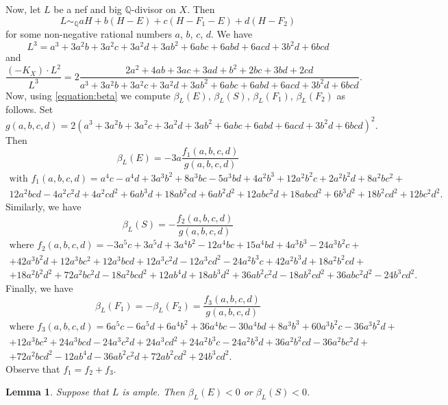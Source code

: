 \documentclass[12pt]{amsart}
\newtheorem{lemma}[theorem]{Lemma}
\theoremstyle{definition}
\theoremstyle{remark}
\begin{document}
Now, let $L$ be a nef and big $\mathbb{Q}$-divisor on $X$. Then
$$
L\sim_{\mathbb{Q}} aH+b(H-E)+c(H-F_1-E)+d(H-F_2)
$$
for some non-negative rational numbers $a$, $b$, $c$, $d$. We have
$$
L^3=a^3+3a^2b+3a^2c+3a^2d+3ab^2+6abc+6abd+6acd+3b^2d+6bcd
$$
and
$$
\frac{(-K_X)\cdot L^{2}}{L^3}=2\frac{2a^2+4ab+3ac+3ad+b^2+2bc+3bd+2cd}{a^3+3a^2b+3a^2c+3a^2d+3ab^2+6abc+6abd+6acd+3b^2d+6bcd}.
$$
Now, using \eqref{equation:beta} we compute $\beta_L(E)$, $\beta_L(S)$, $\beta_L(F_1)$, $\beta_L(F_2)$ as follows. Set
$$
g(a,b,c,d)=2(a^3+3a^2b+3a^2c+3a^2d+3ab^2+6abc+6abd+6acd+3b^2d+6bcd)^2.
$$
Then
$$
\beta_{L}(E)=-3a\frac{f_1(a,b,c,d)}{g(a,b,c,d)}
$$
\begin{multline*}
\text{with }f_1(a,b,c,d)=a^4c-a^4d+3a^3b^2+8a^3bc-5a^3bd+4a^2b^3+12a^2b^2c
+2a^2b^2d+8a^2bc^2+\\12a^2bcd-4a^2c^2d+4a^2cd^2+6ab^3d+18ab^2cd+6ab^2d^2
+12abc^2d+18abcd^2+6b^3d^2+18b^2cd^2+12bc^2d^2.
\end{multline*}
Similarly, we have
$$
\beta_{L}(S)=-\frac{f_{2}(a,b,c,d)}{g(a,b,c,d)}
$$
\begin{multline*}
\text{where }f_2(a,b,c,d)=-3a^5c+3a^5d+3a^4b^2-12a^4bc+15a^4bd+4a^3b^3-24a^3b^2c+\\
+42a^3b^2d+12a^3bc^2+12a^3bcd+12a^3c^2d-12a^3cd^2-24a^2b^3c+42a^2b^3d+18a^2b^2cd+\\
+18a^2b^2d^2+72a^2bc^2d-18a^2bcd^2+12ab^4d+18ab^3d^2+36ab^2c^2d-18ab^2cd^2+36abc^2d^2-24b^3cd^2.
\end{multline*}
Finally, we have
$$
\beta_{L}(F_1)=-\beta_{L}(F_2)=\frac{f_{3}(a,b,c,d)}{g(a,b,c,d)}
$$
\begin{multline*}
\text{where }f_3(a,b,c,d)=6a^5c-6a^5d+6a^4b^2+36a^4bc-30a^4bd+8a^3b^3+60a^3b^2c-36a^3b^2d+\\
+12a^3bc^2+24a^3bcd-24a^3c^2d+24a^3cd^2+24a^2b^3c-24a^2b^3d+36a^2b^2cd-36a^2bc^2d+\\
+72a^2bcd^2-12ab^4d-36ab^2c^2d+ 72ab^2cd^2+24b^3cd^2.
\end{multline*}
Observe that $f_1=f_2+f_3$.

\begin{lemma}
\label{lemma:4-9}
Suppose that $L$ is ample. Then $\beta_L(E)<0$ or $\beta_L(S)<0$.
\end{lemma}
\end{document}
